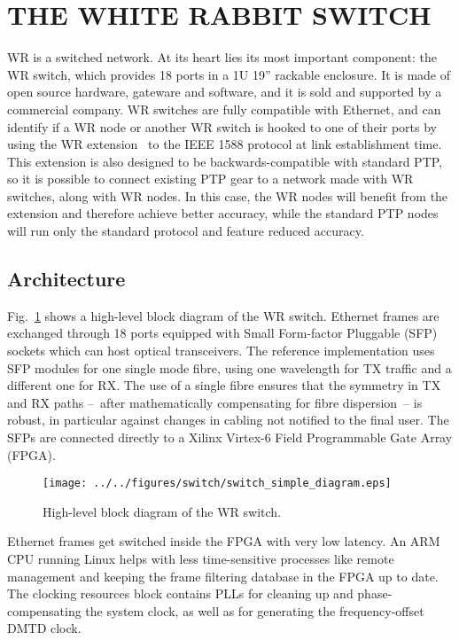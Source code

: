 \documentclass{../JAC2003}
\begin{document}
\section{THE WHITE RABBIT SWITCH}

WR is a switched network. At its heart lies its most important
component: the WR switch, which provides 18 ports in a 1U 19''
rackable enclosure. It is made of open source hardware, gateware and
software, and it is sold and supported by a commercial company. WR
switches are fully compatible with Ethernet, and can identify if a WR
node or another WR switch is hooked to one of their ports by using the
WR extension~\cite{wr-extension-ref} to the IEEE 1588 protocol at
link establishment time. This extension is also designed to be
backwards-compatible with standard PTP, so it is possible to connect
existing PTP gear to a network made with WR switches, along with WR
nodes. In this case, the WR nodes will benefit from the extension and
therefore achieve better accuracy, while the standard PTP nodes will
run only the standard protocol and feature reduced accuracy.

\subsection{Architecture}

Fig.~\ref{switch-top-fig} shows a high-level block diagram of the WR
switch. Ethernet frames are exchanged through 18 ports equipped with
Small Form-factor Pluggable (SFP) sockets which can host optical
transceivers. The reference implementation uses SFP modules for one
single mode fibre, using one wavelength for TX traffic and a different
one for RX. The use of a single fibre ensures that the symmetry in TX
and RX paths --~after mathematically compensating for fibre
dispersion~-- is robust, in particular against changes in cabling not
notified to the final user. The SFPs are connected directly to a
Xilinx Virtex-6 Field Programmable Gate Array (FPGA).

\begin{figure}[htb]
   \centering
   \texttt{[image: ../../figures/switch/switch\_simple\_diagram.eps]}
   \caption{High-level block diagram of the WR switch.}
   \label{switch-top-fig}
\end{figure}

Ethernet frames get switched inside the FPGA with very low latency. An
ARM CPU running Linux helps with less time-sensitive processes like
remote management and keeping the frame filtering database in the FPGA
up to date. The clocking resources block contains PLLs for cleaning up
and phase-compensating the system clock, as well as for generating the
frequency-offset DMTD clock.
\end{document}
